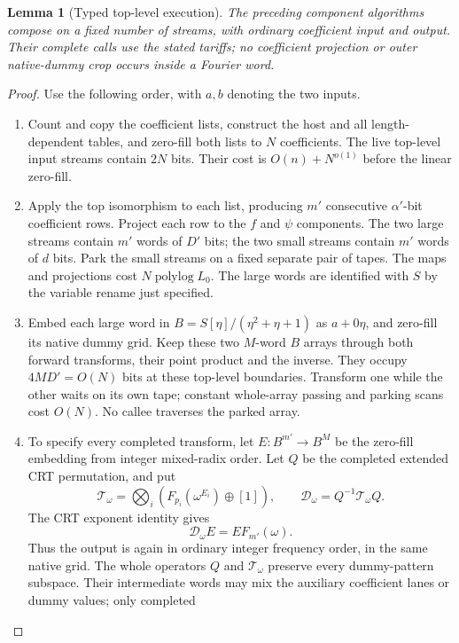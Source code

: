\documentclass[11pt]{article}
\newtheorem{lemma}[theorem]{Lemma}
\newcommand{\polylog}{\operatorname{polylog}}
\begin{document}
\begin{lemma}[Typed top-level execution]
\label{lem:typed-execution}
The preceding component algorithms compose on a fixed number of streams,
with ordinary coefficient input and output. Their complete calls use
the stated tariffs; no coefficient projection or outer native-dummy crop
occurs inside a Fourier word.
\end{lemma}
\begin{proof}
Use the following order, with $a,b$ denoting the two inputs.
\begin{enumerate}
\item Count and copy the coefficient lists, construct the host and all
length-dependent tables, and zero-fill both lists to $N$ coefficients.
The live top-level input streams contain $2N$ bits. Their cost is
$O(n)+N^{o(1)}$ before the linear zero-fill.
\item Apply the top isomorphism to each list, producing $m'$ consecutive
$\alpha'$-bit coefficient rows. Project each row to the $f$ and $\psi$
components. The two large streams contain $m'$ words of $D'$ bits;
the two small streams contain $m'$ words of $d$ bits. Park the small
streams on a fixed separate pair of tapes. The maps and projections cost
$N\polylog L_0$. The large words are identified with $S$ by the variable
rename just specified.
\item Embed each large word in $B=S[\eta]/(\eta^2+\eta+1)$ as $a+0\eta$,
and zero-fill its native dummy grid. Keep these two $M$-word $B$ arrays
through both forward transforms, their point product and the inverse.
They occupy $4MD'=O(N)$ bits at these top-level boundaries.
Transform one while the other waits on its own tape; constant whole-array
passing and parking scans cost $O(N)$. No callee traverses the parked
array.
\item To specify every completed transform, let $E:B^{m'}\to B^M$
be the zero-fill embedding from integer mixed-radix order. Let $Q$ be
the completed extended CRT permutation, and put
\[
 \mathcal T_{\omega}=\bigotimes_i(F_{p_i}(\omega^{E_i})\oplus[1]),
 \qquad \mathcal D_{\omega}=Q^{-1}\mathcal T_{\omega}Q.
\]
The CRT exponent identity gives
\begin{equation}
 \label{eq:typed-dft}
 \mathcal D_{\omega}E=E F_{m'}(\omega).
\end{equation}
Thus the output is again in ordinary integer frequency order, in the
same native grid. The whole operators $Q$ and $\mathcal T_\omega$
preserve every dummy-pattern subspace. Their intermediate words may
mix the auxiliary coefficient lanes or dummy values; only completed

\end{enumerate}
\end{proof}
\end{document}
